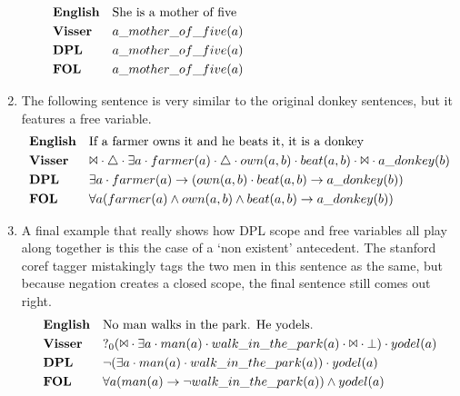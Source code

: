 \documentclass[12pt]{article}
\begin{document}
\begin{enumerate}
\begin{align*}
&\text{\textbf{English}}&&\text{She is a mother of five}\hspace{15em} \\
&\text{\textbf{Visser}}&&a\_mother\_of\_five(a) \\
&\text{\textbf{DPL}}&&a\_mother\_of\_five(a) \\
&\text{\textbf{FOL}}&&a\_mother\_of\_five(a) \\
\end{align*}
\item
The following sentence is very similar to the original donkey sentences, but it features a free variable.
\begin{align*}
&\text{\textbf{English}}&&\text{If a farmer owns it and he beats it, it is a donkey} \\
&\text{\textbf{Visser}}&&\Bowtie \cdot \triangle \cdot \exists a \cdot farmer(a) \cdot \triangle \cdot own(a,b) \cdot beat(a,b) \cdot \Bowtie \cdot a\_donkey(b) \\
&\text{\textbf{DPL}}&&\exists a \cdot farmer(a) \rightarrow (own(a,b) \cdot beat(a,b) \rightarrow a\_donkey(b)) \\
&\text{\textbf{FOL}}&&\forall a(farmer(a) \wedge own(a,b) \wedge beat(a,b) \rightarrow a\_donkey(b)) \\
\end{align*}
\item
A final example that really shows how DPL scope and free variables all play along together is this the case of a `non existent' antecedent. The stanford coref tagger mistakingly tags the two men in this sentence as the same, but because negation creates a closed scope, the final sentence still comes out right.
\begin{align*}
&\text{\textbf{English}}&&\text{No man walks in the park. He yodels.} \\
&\text{\textbf{Visser}}&&?_0(\Bowtie \cdot \exists a \cdot man(a) \cdot walk\_in\_the\_park(a) \cdot \Bowtie \cdot \bot) \cdot yodel(a) \\
&\text{\textbf{DPL}}&&\neg (\exists a \cdot man(a) \cdot walk\_in\_the\_park(a)) \cdot yodel(a) \\
&\text{\textbf{FOL}}&&\forall a(man(a) \rightarrow \neg walk\_in\_the\_park(a)) \wedge yodel(a) \\
\end{align*}

\end{enumerate}
\end{document}
